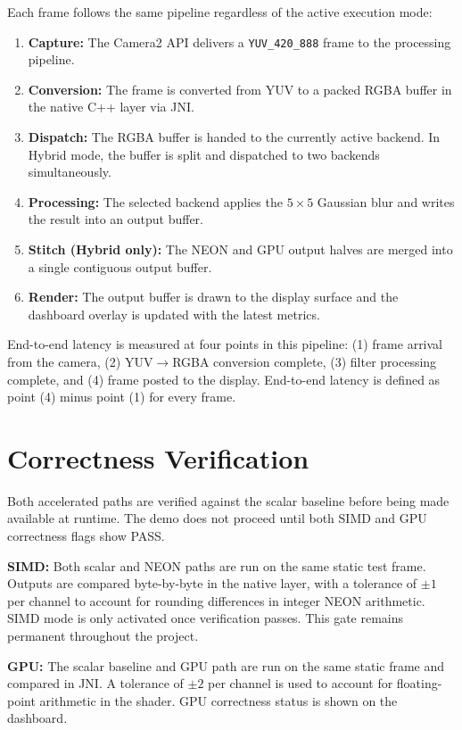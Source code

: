 \documentclass[12pt, a4paper]{article}
\begin{document}
Each frame follows the same pipeline regardless of the active execution mode:
\begin{enumerate}
    \item \textbf{Capture:} The Camera2 API delivers a \texttt{YUV\_420\_888} frame to the
          processing pipeline.
    \item \textbf{Conversion:} The frame is converted from YUV to a packed RGBA buffer in the
          native C++ layer via JNI.
    \item \textbf{Dispatch:} The RGBA buffer is handed to the currently active backend. In
          Hybrid mode, the buffer is split and dispatched to two backends simultaneously.
    \item \textbf{Processing:} The selected backend applies the $5 \times 5$ Gaussian blur and
          writes the result into an output buffer.
    \item \textbf{Stitch (Hybrid only):} The NEON and GPU output halves are merged into a
          single contiguous output buffer.
    \item \textbf{Render:} The output buffer is drawn to the display surface and the dashboard
          overlay is updated with the latest metrics.
\end{enumerate}

End-to-end latency is measured at four points in this pipeline: (1) frame arrival from the
camera, (2) YUV$\rightarrow$RGBA conversion complete, (3) filter processing complete,
and (4) frame posted to the display. End-to-end latency is defined as point (4) minus
point (1) for every frame.

\section{Correctness Verification}

Both accelerated paths are verified against the scalar baseline before being made available
at runtime. The demo does not proceed until both SIMD and GPU correctness flags show PASS.

\textbf{SIMD:} Both scalar and NEON paths are run on the same static test frame. Outputs are
compared byte-by-byte in the native layer, with a tolerance of $\pm 1$ per channel
to account for rounding differences in integer NEON arithmetic. SIMD mode is only activated
once verification passes. This gate remains permanent throughout the project.

\textbf{GPU:} The scalar baseline and GPU path are run on the same static frame and compared
in JNI. A tolerance of $\pm 2$ per channel is used to account for floating-point arithmetic
in the shader. GPU correctness status is shown on the dashboard.
\end{document}

